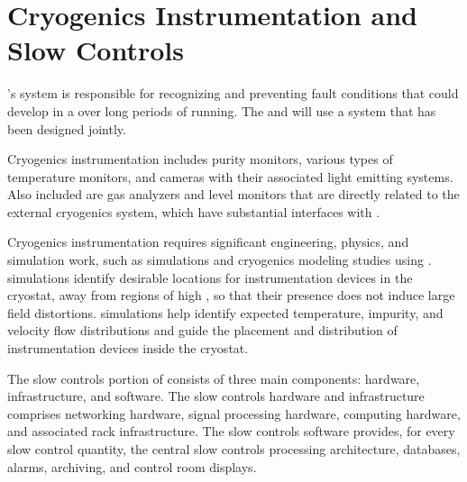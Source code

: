 \section{Cryogenics Instrumentation and Slow Controls}
\label{sec:dp-execsum-sc}


's  system is responsible for recognizing and preventing fault conditions that could develop in a  over long periods of running. 
The  and  will use a  system that has been designed jointly.

Cryogenics instrumentation includes purity monitors,  various types of temperature monitors, and cameras with their associated light emitting systems. Also included are %
gas analyzers and  level monitors that are directly related to the external cryogenics system, which have substantial interfaces with . %

Cryogenics instrumentation %
requires significant engineering, physics, and
simulation work, such as \efield simulations and cryogenics modeling
studies using . \efield simulations
identify desirable locations for instrumentation
devices in the cryostat, away from %
regions of high \efield, so that %
their presence does not induce large field distortions. 
 simulations help identify %
expected temperature, impurity, and velocity flow distributions and guide the placement and distribution of instrumentation devices inside the cryostat.

The slow controls portion of  consists of three main components: 
hardware, infrastructure, and software. The slow controls hardware and infrastructure comprises networking hardware, signal processing hardware, computing hardware, and associated rack infrastructure. The slow controls software provides, for every slow control quantity, the central slow controls processing architecture, databases, alarms, archiving, and control room displays.



